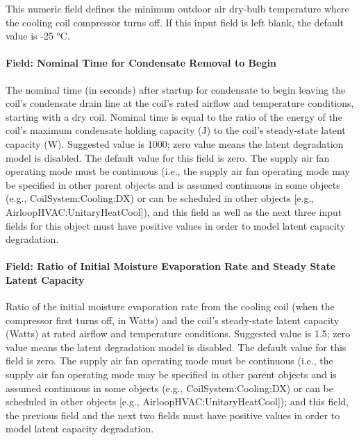 This numeric field defines the minimum outdoor air dry-bulb temperature where the cooling coil compressor turns off. If this input field is left blank, the default value is -25 °C.

\paragraph{Field: Nominal Time for Condensate Removal to Begin}\label{field-nominal-time-for-condensate-removal-to-begin}

The nominal time (in seconds) after startup for condensate to begin leaving the coil's condensate drain line at the coil's rated airflow and temperature conditions, starting with a dry coil. Nominal time is equal to the ratio of the energy of the coil's maximum condensate holding capacity (J) to the coil's steady-state latent capacity (W). Suggested value is 1000; zero value means the latent degradation model is disabled. The default value for this field is zero. The supply air fan operating mode must be continuous (i.e., the supply air fan operating mode may be specified in other parent objects and is assumed continuous in some objects (e.g., CoilSystem:Cooling:DX) or can be scheduled in other objects {[}e.g., AirloopHVAC:UnitaryHeatCool{]}), and this field as well as the next three input fields for this object must have positive values in order to model latent capacity degradation.

\paragraph{Field: Ratio of Initial Moisture Evaporation Rate and Steady State Latent Capacity}\label{field-ratio-of-initial-moisture-evaporation-rate-and-steady-state-latent-capacity}

Ratio of the initial moisture evaporation rate from the cooling coil (when the compressor first turns off, in Watts) and the coil's steady-state latent capacity (Watts) at rated airflow and temperature conditions. Suggested value is 1.5; zero value means the latent degradation model is disabled. The default value for this field is zero. The supply air fan operating mode must be continuous (i.e., the supply air fan operating mode may be specified in other parent objects and is assumed continuous in some objects (e.g., CoilSystem:Cooling:DX) or can be scheduled in other objects {[}e.g., AirloopHVAC:UnitaryHeatCool{]}); and this field, the previous field and the next two fields must have positive values in order to model latent capacity degradation.

